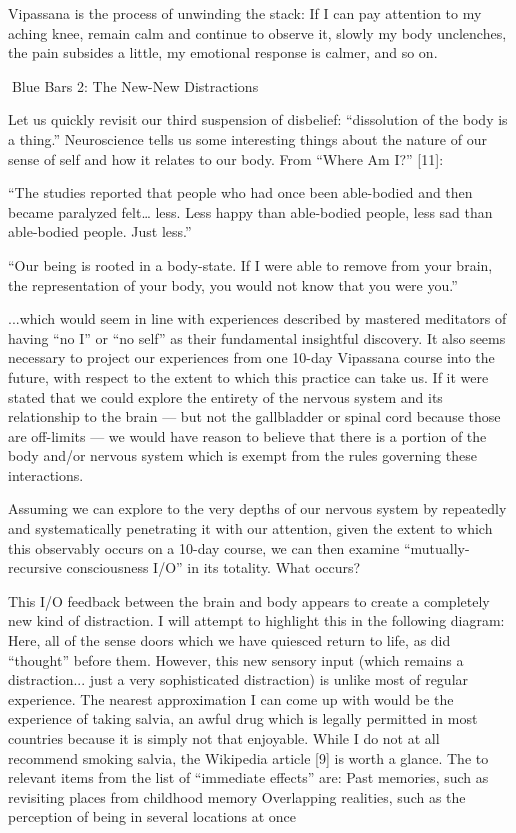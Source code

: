 \documentclass{article}
\begin{document}
Vipassana is the process of unwinding the stack: If I can pay attention to my aching knee, remain calm and continue to observe it, slowly my body unclenches, the pain subsides a little, my emotional response is calmer, and so on.

Blue Bars 2:
The New-New Distractions


Let us quickly revisit our third suspension of disbelief: ``dissolution of the body is a thing.'' Neuroscience tells us some interesting things about the nature of our sense of self and how it relates to our body. From ``Where Am I?'' [11]:

“The studies reported that people who had once been able-bodied and then became paralyzed felt… less. Less happy than able-bodied people, less sad than able-bodied people. Just less.”

“Our being is rooted in a body-state. If I were able to remove from your brain, the representation of your body, you would not know that you were you.”

...which would seem in line with experiences described by mastered meditators of having ``no I'' or ``no self'' as their fundamental insightful discovery. It also seems necessary to project our experiences from one 10-day Vipassana course into the future, with respect to the extent to which this practice can take us. If it were stated that we could explore the entirety of the nervous system and its relationship to the brain — but not the gallbladder or spinal cord because those are off-limits — we would have reason to believe that there is a portion of the body and/or nervous system which is exempt from the rules governing these interactions.

Assuming we can explore to the very depths of our nervous system by repeatedly and systematically penetrating it with our attention, given the extent to which this observably occurs on a 10-day course, we can then examine ``mutually-recursive consciousness I/O'' in its totality. What occurs?

This I/O feedback between the brain and body appears to create a completely new kind of distraction. I will attempt to highlight this in the following diagram:
Here, all of the sense doors which we have quiesced return to life, as did ``thought'' before them. However, this new sensory input (which remains a distraction... just a very sophisticated distraction) is unlike most of regular experience. The nearest approximation I can come up with would be the experience of taking salvia, an awful drug which is legally permitted in most countries because it is simply not that enjoyable. While I do not at all recommend smoking salvia, the Wikipedia article [9] is worth a glance. The to relevant items from the list of ``immediate effects'' are:
Past memories, such as revisiting places from childhood memory
Overlapping realities, such as the perception of being in several locations at once
\end{document}
